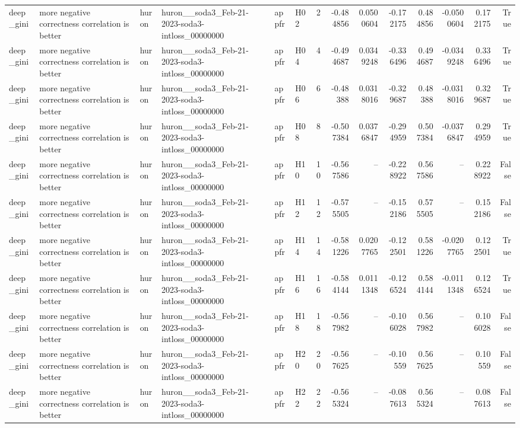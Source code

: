 \begin{longtable}{llllllrrrrrrrr}
deep\_gini & more negative correctness correlation is better & huron & huron\_\_soda3\_Feb-21-2023-soda3-intloss\_00000000 & appfr & H02 & 2 & -0.484856 & 0.0500604 & -0.172175 & 0.484856 & -0.0500604 & 0.172175 & True \\
deep\_gini & more negative correctness correlation is better & huron & huron\_\_soda3\_Feb-21-2023-soda3-intloss\_00000000 & appfr & H04 & 4 & -0.494687 & 0.0349248 & -0.336496 & 0.494687 & -0.0349248 & 0.336496 & True \\
deep\_gini & more negative correctness correlation is better & huron & huron\_\_soda3\_Feb-21-2023-soda3-intloss\_00000000 & appfr & H06 & 6 & -0.48388 & 0.0318016 & -0.329687 & 0.48388 & -0.0318016 & 0.329687 & True \\
deep\_gini & more negative correctness correlation is better & huron & huron\_\_soda3\_Feb-21-2023-soda3-intloss\_00000000 & appfr & H08 & 8 & -0.507384 & 0.0376847 & -0.294959 & 0.507384 & -0.0376847 & 0.294959 & True \\
deep\_gini & more negative correctness correlation is better & huron & huron\_\_soda3\_Feb-21-2023-soda3-intloss\_00000000 & appfr & H10 & 10 & -0.567586 & -- & -0.228922 & 0.567586 & -- & 0.228922 & False \\
deep\_gini & more negative correctness correlation is better & huron & huron\_\_soda3\_Feb-21-2023-soda3-intloss\_00000000 & appfr & H12 & 12 & -0.575505 & -- & -0.152186 & 0.575505 & -- & 0.152186 & False \\
deep\_gini & more negative correctness correlation is better & huron & huron\_\_soda3\_Feb-21-2023-soda3-intloss\_00000000 & appfr & H14 & 14 & -0.581226 & 0.0207765 & -0.122501 & 0.581226 & -0.0207765 & 0.122501 & True \\
deep\_gini & more negative correctness correlation is better & huron & huron\_\_soda3\_Feb-21-2023-soda3-intloss\_00000000 & appfr & H16 & 16 & -0.584144 & 0.0111348 & -0.126524 & 0.584144 & -0.0111348 & 0.126524 & True \\
deep\_gini & more negative correctness correlation is better & huron & huron\_\_soda3\_Feb-21-2023-soda3-intloss\_00000000 & appfr & H18 & 18 & -0.567982 & -- & -0.106028 & 0.567982 & -- & 0.106028 & False \\
deep\_gini & more negative correctness correlation is better & huron & huron\_\_soda3\_Feb-21-2023-soda3-intloss\_00000000 & appfr & H20 & 20 & -0.567625 & -- & -0.10559 & 0.567625 & -- & 0.10559 & False \\
deep\_gini & more negative correctness correlation is better & huron & huron\_\_soda3\_Feb-21-2023-soda3-intloss\_00000000 & appfr & H22 & 22 & -0.565324 & -- & -0.087613 & 0.565324 & -- & 0.087613 & False \\

\end{longtable}
